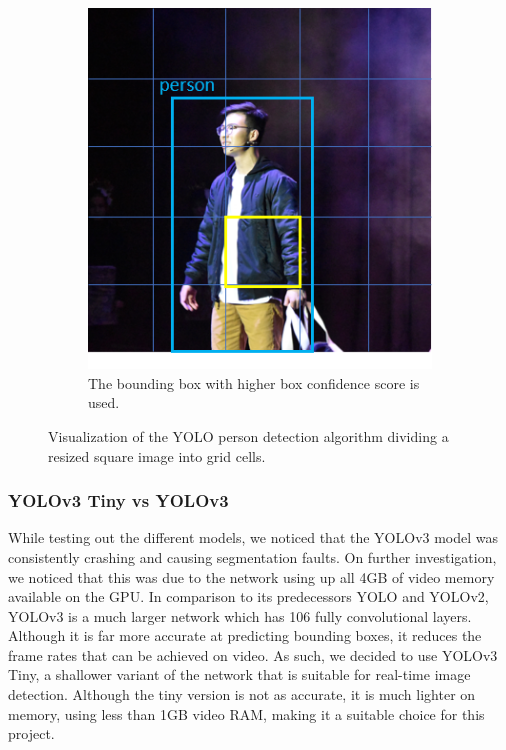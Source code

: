 \begin{figure}[ht]
\begin{subfigure}[b]{.45\textwidth}
        \centering
        \includegraphics[width=1.0\linewidth]{img/chapter5_implementation/yoloAlgo.png}
        \caption{The bounding box with higher box confidence score is used.}
    \end{subfigure}
    \vspace{-1\baselineskip}
    \begin{center}
        \caption{Visualization of the YOLO person detection algorithm dividing a resized square image into grid cells.}
        \label{fig:yoloViz}
    \end{center}
    \vspace{-2\baselineskip}
\end{figure}

\subsubsection{YOLOv3 Tiny vs YOLOv3}
While testing out the different models, we noticed that the YOLOv3 model was consistently crashing and causing segmentation faults. On further investigation, we noticed that this was due to the network using up all 4GB of video memory available on the GPU. In comparison to its predecessors YOLO and YOLOv2, YOLOv3 is a much larger network which has 106 fully convolutional layers. Although it is far more accurate at predicting bounding boxes, it reduces the frame rates that can be achieved on video. As such, we decided to use YOLOv3 Tiny, a shallower variant of the network that is suitable for real-time image detection. Although the tiny version is not as accurate, it is much lighter on memory, using less than 1GB video RAM, making it a suitable choice for this project.

